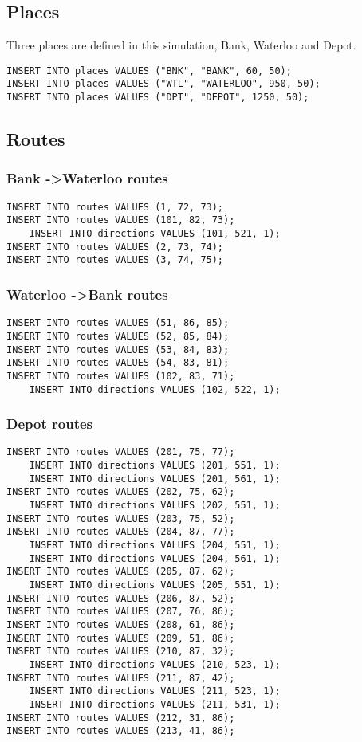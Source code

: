 \documentclass[12pt,a4paper]{article}
\begin{document}
\subsection{Places}
Three places are defined in this simulation, Bank, Waterloo and Depot.
\begin{verbatim}
INSERT INTO places VALUES ("BNK", "BANK", 60, 50);
INSERT INTO places VALUES ("WTL", "WATERLOO", 950, 50);
INSERT INTO places VALUES ("DPT", "DEPOT", 1250, 50);
\end{verbatim}

\subsection{Routes}
\subsubsection{Bank -\textgreater Waterloo routes}
\begin{verbatim}
INSERT INTO routes VALUES (1, 72, 73);
INSERT INTO routes VALUES (101, 82, 73);
    INSERT INTO directions VALUES (101, 521, 1);
INSERT INTO routes VALUES (2, 73, 74);
INSERT INTO routes VALUES (3, 74, 75);
\end{verbatim}

\subsubsection{Waterloo -\textgreater Bank routes}
\begin{verbatim}
INSERT INTO routes VALUES (51, 86, 85);
INSERT INTO routes VALUES (52, 85, 84);
INSERT INTO routes VALUES (53, 84, 83);
INSERT INTO routes VALUES (54, 83, 81);
INSERT INTO routes VALUES (102, 83, 71);
    INSERT INTO directions VALUES (102, 522, 1);
\end{verbatim}

\subsubsection{Depot routes}
\begin{verbatim}
INSERT INTO routes VALUES (201, 75, 77);
    INSERT INTO directions VALUES (201, 551, 1);
    INSERT INTO directions VALUES (201, 561, 1);
INSERT INTO routes VALUES (202, 75, 62);
    INSERT INTO directions VALUES (202, 551, 1);
INSERT INTO routes VALUES (203, 75, 52);
INSERT INTO routes VALUES (204, 87, 77);
    INSERT INTO directions VALUES (204, 551, 1);
    INSERT INTO directions VALUES (204, 561, 1);
INSERT INTO routes VALUES (205, 87, 62);
    INSERT INTO directions VALUES (205, 551, 1);
INSERT INTO routes VALUES (206, 87, 52);
INSERT INTO routes VALUES (207, 76, 86);
INSERT INTO routes VALUES (208, 61, 86);
INSERT INTO routes VALUES (209, 51, 86);
INSERT INTO routes VALUES (210, 87, 32);
    INSERT INTO directions VALUES (210, 523, 1);
INSERT INTO routes VALUES (211, 87, 42);
    INSERT INTO directions VALUES (211, 523, 1);
    INSERT INTO directions VALUES (211, 531, 1);
INSERT INTO routes VALUES (212, 31, 86);
INSERT INTO routes VALUES (213, 41, 86);
\end{verbatim}
\end{document}
